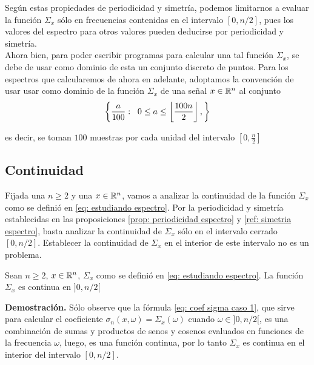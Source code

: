 \begin{nota}
\label{nota: muestreo dom frecuencia}
Según estas propiedades de periodicidad y simetría,
podemos limitarnos a evaluar la función
$\Sigma_{x}$ sólo en frecuencias
contenidas en el intervalo $[0, n/2]$, pues los valores
del espectro para otros valores pueden deducirse por periodicidad
y simetría. \\

Ahora bien, para poder escribir programas
para calcular una tal función $\Sigma_{x}$,
se debe de usar como dominio de esta
un conjunto discreto de puntos.
Para los espectros que calcularemos de ahora en 
adelante, adoptamos la convención de 
usar usar como dominio 
de la función
$\Sigma_{x}$ de una señal $x \in \mathbb{R}^{n}$
al conjunto
\begin{equation}
\label{eq: malla frecuencias}
\left\{ \frac{a}{100} : \hspace{0.2cm}
0 \leq a \leq 
\left\lfloor\frac{100n}{2}\right\rfloor,
\right\}
\end{equation}

\noindent
es decir, se toman $100$ muestras por
cada unidad del intervalo 
$\left[ 0, \frac{n}{2}\right]$
\end{nota}

\subsection{Continuidad}

Fijada una $n \geq 2$ y una $x \in \mathbb{R}^{n}$,
vamos a analizar la continuidad de la función
$\Sigma_{x}$ como se definió 
en \eqref{eq: estudiando espectro}.
Por la periodicidad y simetría establecidas
en las proposiciones 
\ref{prop: periodicidad espectro}
y \ref{ref: simetria espectro}, basta
analizar la continuidad de $\Sigma_{x}$ sólo en el
intervalo cerrado $[0, n/2]$. Establecer la continuidad
de $\Sigma_{x}$ en el interior de este intervalo no es un problema. \\

\begin{prop}
\label{prop: cont interior espectro}
Sean $n \geq 2$, $x \in \mathbb{R}^{n}$,
$\Sigma_{x}$ como se definió en \eqref{eq: estudiando espectro}.
La función $\Sigma_{x}$ es continua en 
$]0, n/2[$
\end{prop}
\noindent
\textbf{Demostración.}
Sólo observe que la fórmula
\eqref{eq: coef sigma caso 1}, que sirve
para calcular el coeficiente $\sigma_{n} (x, \omega) = \Sigma_{x}(\omega)$
cuando $\omega \in ]0, n/2[$, es una combinación
de sumas y productos de senos y cosenos
evaluados en funciones de la frecuencia $\omega$, luego, 
es una función continua, por lo tanto $\Sigma_{x}$
es continua en el interior del intervalo 
$[0, n/2]$.
\QEDB
\vspace{0.2cm}

